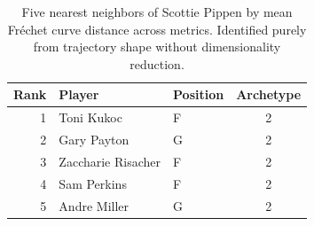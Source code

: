 \begin{table}[htbp]
  \centering\small
  \begin{tabular}{rllc}
    \toprule
    Rank & Player & Position & Archetype \\
    \midrule
    1 & Toni Kukoc & F & 2 \\
    2 & Gary Payton & G & 2 \\
    3 & Zaccharie Risacher & F & 2 \\
    4 & Sam Perkins & F & 2 \\
    5 & Andre Miller & G & 2 \\
    \bottomrule
  \end{tabular}
  \caption{Five nearest neighbors of Scottie Pippen by mean Fr\'{e}chet curve distance across metrics. Identified purely from trajectory shape without dimensionality reduction.}
  \label{tab:Scottie_Pippen_frechet_curve_neighbors}
\end{table}

